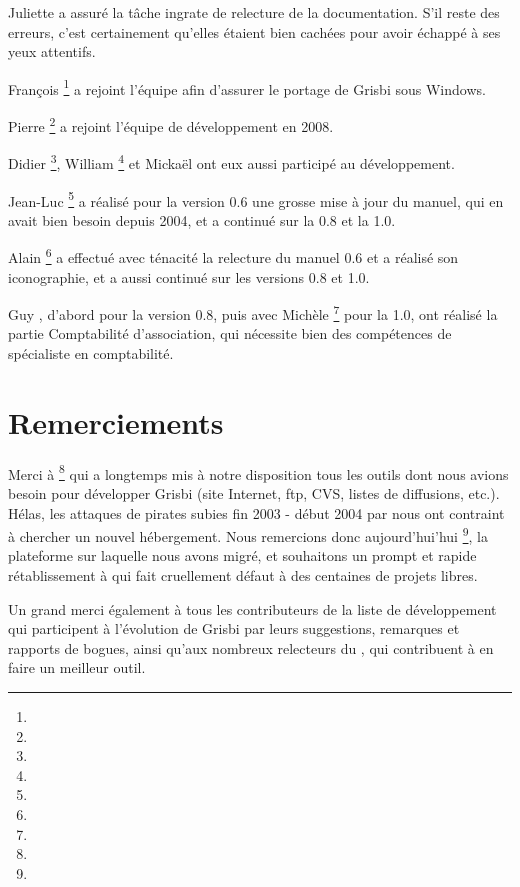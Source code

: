 Juliette  a assuré la tâche ingrate de relecture de la documentation. S'il reste des erreurs, c'est certainement qu'elles étaient bien cachées pour avoir échappé à ses yeux attentifs.

François \footnote{\urlFrancoisTerrotEmail{}} a rejoint l'équipe afin d'assurer le \gls{portage} de Grisbi sous \gls{Windows}.

Pierre \footnote{\urlPierreBiavaEmail{}} a rejoint l'équipe de développement en 2008.

Didier \footnote{\urlDidierChevalierEmail{}}, William \footnote{\urlWilliamOllivierEmail{}} et Mickaël  ont eux aussi participé au développement.

Jean-Luc \footnote{\urlJeanLucDuflotEmail{}} a réalisé pour la version 0.6 une grosse mise à jour du manuel, qui en avait bien besoin depuis 2004, et a continué sur la 0.8 et la 1.0.

Alain \footnote{\urlAlainLetientEmail{}} a effectué avec ténacité la relecture du manuel 0.6 et a réalisé son iconographie, et a aussi continué sur les versions 0.8 et 1.0.

Guy , d'abord pour la version 0.8, puis avec Michèle \footnote{\urlMicheleBondilEmail{}} pour la 1.0, ont réalisé la partie Comptabilité d'association, qui nécessite bien des compétences de spécialiste en comptabilité.


\section{Remerciements\label{introduction-thanks}}


Merci à \footnote{\urlTuxFamily{}} qui a longtemps mis à notre disposition tous les outils dont nous avions besoin pour développer Grisbi (site Internet, ftp, CVS, listes de diffusions, etc.). Hélas, les attaques de pirates subies fin 2003 - début 2004 par  nous ont contraint à chercher un nouvel hébergement. Nous remercions donc aujourd'hui'hui \footnote{\urlSourceForge{}}, la plateforme sur laquelle nous avons migré, et souhaitons un prompt et rapide rétablissement à  qui fait cruellement défaut à des centaines de projets libres.

Un grand merci également à tous les contributeurs de la liste de développement qui participent à l'évolution de Grisbi par leurs suggestions, remarques et rapports de bogues, ainsi qu'aux nombreux relecteurs du , qui contribuent à en faire un meilleur outil.


